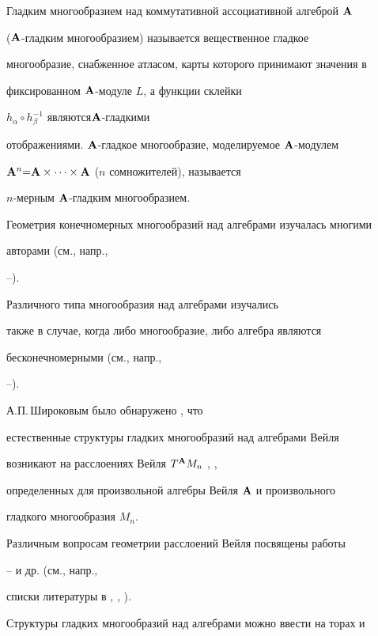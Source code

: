  


Гладким многообразием над коммутативной ассоциативной алгеброй  ${\bold A}$


(${\bold A}$-гладким многообразием) называется вещественное гладкое


многообразие, снабженное атласом, карты которого принимают значения в


фиксированном  ${\bold A}$-модуле  $L$, а функции склейки


$h_\alpha\circ h_\beta^{-1}$ являются\linebreak ${\bold A}$-гладкими


отображениями. ${\bold A}$-гладкое многообразие, моделируемое ${\bold A}$-модулем


${\bold A}^n{=}{\bold A}\times\dotsb\times{\bold A}$ ($n$ сомножителей), называется


$n$-мерным  ${\bold A}$-гладким многообразием.


 


Геометрия конечномерных многообразий над алгебрами изучалась многими


авторами (см., напр., 


\cite{Shir}--\cite{VSh4}).


Различного типа многообразия над алгебрами изучались


также в случае, когда либо многообразие, либо алгебра являются


бесконечномерными (см., напр.,


\cite{Kob}--\cite{Vas-Pap}).


 


А.П.\,Широковым было обнаружено \cite{Shir}, что


естественные структуры гладких многообразий над алгебрами Вейля


возникают на расслоениях Вейля  $T^{\bold A} M_n$ \cite{Weil}, \cite{KMS},


определенных для произвольной алгебры Вейля ${\bold A}$ и произвольного


гладкого многообразия  $M_n$.


Различным вопросам геометрии расслоений Вейля посвящены работы


\cite{Pat}--\cite{MRM} и др. (см., напр.,


списки литературы в \cite{KMS}, \cite{Shir}, \cite{VSh4}).


 


Структуры гладких многообразий над алгебрами можно ввести на торах и



